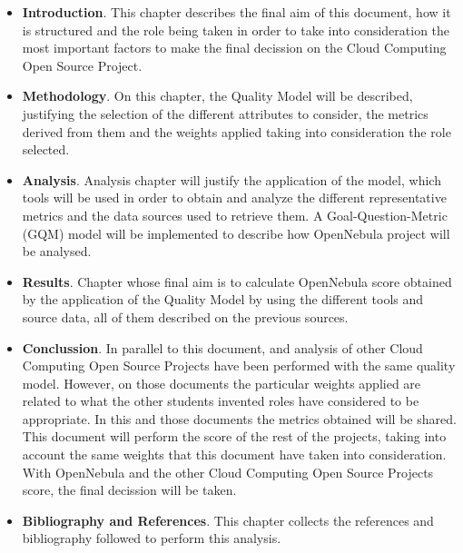 \documentclass[11pt]{article}
\begin{document}
\begin{itemize}\itemsep0pt
\item{\textbf{Introduction}}. This chapter describes the final aim of this document, how it is structured and the role being taken in order to take into consideration the most important factors to make the final decission on the Cloud Computing Open Source Project.
\item{\textbf{Methodology}}. On this chapter, the Quality Model will be described, justifying the selection of the different attributes to consider, the metrics derived from them and the weights applied taking into consideration the role selected.
\item{\textbf{Analysis}}. Analysis chapter will justify the application of the model, which tools will be used in order to obtain and analyze the different representative metrics and the data sources used to retrieve them. A Goal-Question-Metric (GQM) model will be implemented to describe how OpenNebula project will be analysed.
\item{\textbf{Results}}. Chapter whose final aim is to calculate OpenNebula score obtained by the application of the Quality Model by using the different tools and source data, all of them described on the previous sources.
\item{\textbf{Conclussion}}. In parallel to this document, and analysis of other Cloud Computing Open Source Projects have been performed with the same quality model. However, on those documents the particular weights applied are related to what the other students invented roles have considered to be appropriate. In this and those documents the metrics obtained will be shared.
This document will perform the score of the rest of the projects, taking into account the same weights that this document have taken into consideration. With OpenNebula and the other Cloud Computing Open Source Projects score, the final decission will be taken.

\item{\textbf{Bibliography and References}}. This chapter collects the references and bibliography followed to perform this analysis.


\end{itemize}
\end{document}
